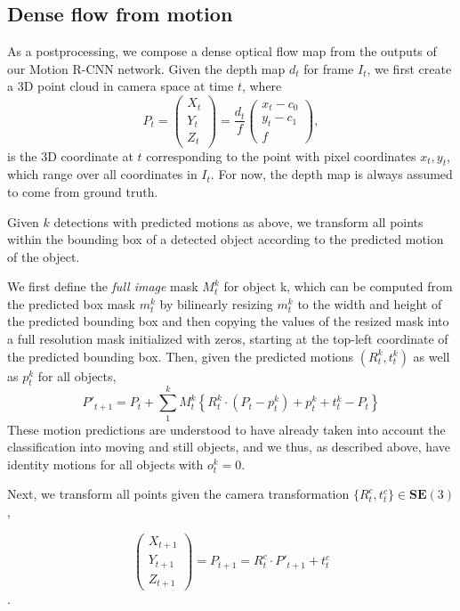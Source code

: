 \subsection{Dense flow from motion}
\label{ssec:postprocessing}
As a postprocessing, we compose a dense optical flow map from the outputs of our Motion R-CNN network.
Given the depth map $d_t$ for frame $I_t$, we first create a 3D point cloud in camera space at time $t$,
where
\begin{equation}
P_t =
\begin{pmatrix}
X_t \\ Y_t \\ Z_t
\end{pmatrix}
=
\frac{d_t}{f}
\begin{pmatrix}
x_t - c_0 \\ y_t - c_1 \\ f
\end{pmatrix},
\end{equation}
is the 3D coordinate at $t$ corresponding to the point with pixel coordinates $x_t, y_t$,
which range over all coordinates in $I_t$.
For now, the depth map is always assumed to come from ground truth.

Given $k$ detections with predicted motions as above, we transform all points within the bounding
box of a detected object according to the predicted motion of the object.

We first define the \emph{full image} mask $M_t^k$ for object k,
which can be computed from the predicted box mask $m_t^k$ by bilinearly resizing
$m_t^k$ to the width and height of the predicted bounding box and then copying the values
of the resized mask into a full resolution mask initialized with zeros,
starting at the top-left coordinate of the predicted bounding box.
Then, given the predicted motions $(R_t^k, t_t^k)$ as well as $p_t^k$ for all objects,
\begin{equation}
P'_{t+1} =
P_t + \sum_1^{k} M_t^k\left\{ R_t^k \cdot (P_t - p_t^k) + p_t^k + t_t^k - P_t \right\}
\end{equation}
These motion predictions are understood to have already taken into account
the classification into moving and still objects,
and we thus, as described above, have identity motions for all objects with $o_t^k = 0$.

Next, we transform all points given the camera transformation $\{R_t^c, t_t^c\} \in \mathbf{SE}(3)$,

\begin{equation}
\begin{pmatrix}
X_{t+1} \\ Y_{t+1} \\ Z_{t+1}
\end{pmatrix}
= P_{t+1} = R_t^c \cdot P'_{t+1} + t_t^c
\end{equation}.

